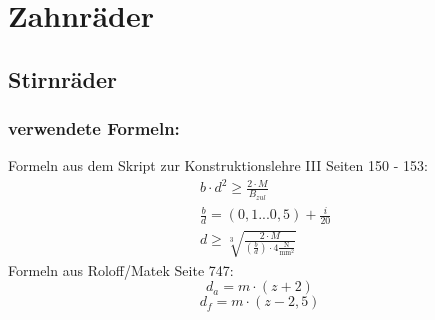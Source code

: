 \section{Zahnräder}
\subsection{Stirnräder}
\subsubsection{verwendete Formeln:}
Formeln aus dem Skript zur Konstruktionslehre III Seiten 150 - 153:
\begin{align*}
	&b \cdot d^2 \ge\frac{2 \cdot M}{B_{zul}} \\
	&\frac{b}{d} = (0,1...0,5) + \frac{i}{20} \\
	&d \ge \sqrt[3]{\frac{2 \cdot M}{( \frac{b}{d}) \cdot  4 \frac{\text{N}}{\text{mm}^2}}}
\end{align*}
Formeln aus Roloff/Matek Seite 747:
\[
	d_a = m \cdot (z+2)
\]
\[
	d_f = m \cdot (z-2,5)
\]
